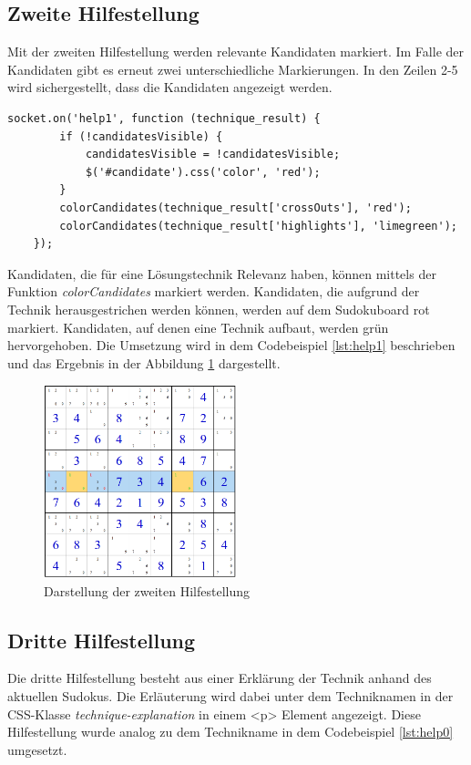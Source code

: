 \subsection{Zweite Hilfestellung}
Mit der zweiten Hilfestellung werden relevante Kandidaten markiert. Im Falle der Kandidaten gibt es erneut zwei unterschiedliche Markierungen. In den Zeilen 2-5 wird sichergestellt, dass die Kandidaten angezeigt werden. 

\begin{lstlisting}[caption={Zweite Hilfestellung}, label={lst:help1}]
	socket.on('help1', function (technique_result) {
		if (!candidatesVisible) {
			candidatesVisible = !candidatesVisible;
			$('#candidate').css('color', 'red');
		}
		colorCandidates(technique_result['crossOuts'], 'red');
		colorCandidates(technique_result['highlights'], 'limegreen');
	});

\end{lstlisting}

Kandidaten, die für eine Lösungstechnik Relevanz haben, können mittels der Funktion \textit{colorCandidates} markiert werden. Kandidaten, die aufgrund der Technik herausgestrichen werden können, werden auf dem Sudokuboard rot markiert. Kandidaten, auf denen eine Technik aufbaut, werden grün hervorgehoben. Die Umsetzung wird in dem Codebeispiel \ref{lst:help1} beschrieben und das Ergebnis in der Abbildung \ref{fig:Help2} dargestellt.

\begin{figure}[H]
	\centering
	\includegraphics[width=0.5\textwidth]{images/Help2.png}
	\caption{Darstellung der zweiten Hilfestellung}
	\label{fig:Help2}
\end{figure}

\subsection{Dritte Hilfestellung}
Die dritte Hilfestellung besteht aus einer Erklärung der Technik anhand des aktuellen Sudokus. Die Erläuterung wird dabei unter dem Techniknamen in der CSS-Klasse \textit{technique-explanation} in einem <p> Element angezeigt. Diese Hilfestellung wurde analog zu dem Technikname in dem Codebeispiel \ref{lst:help0} umgesetzt.

